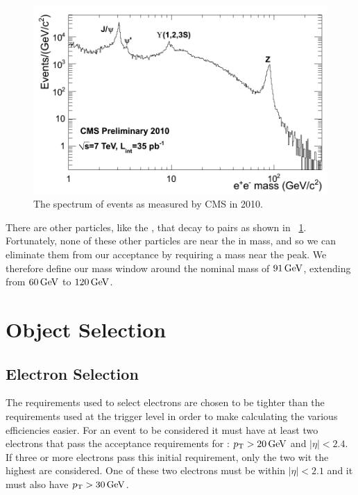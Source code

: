 \begin{figure}[!htbp]
    \centering
    \includegraphics[width=\textwidth]{figures/dielectron_mass_7tev.png}
    \caption{
        The spectrum of \ee events as measured by CMS in 2010.
    }
    \label{fig:ee_spectrum}
\end{figure}

There are other particles, like the \jpsi, that decay to \ee pairs as shown in
\FIG~\ref{fig:ee_spectrum}. Fortunately, none of these other particles are near
the \Z in mass, and so we can eliminate them from our acceptance by requiring a
mass near the \Z peak. We therefore define our mass window around the nominal
\Z mass of $91 \,\text{Ge\hspace{-.08em}V}$, extending from $60 \,\text{Ge\hspace{-.08em}V}$ to $120 \,\text{Ge\hspace{-.08em}V}$.

\section{Object Selection}

\subsection{Electron Selection}
\label{ssec:electron_selection}

The requirements used to select electrons are chosen to be tighter than the
requirements used at the trigger level in order to make calculating the various
efficiencies easier. For an event to be considered it must have at least two
electrons that pass the acceptance requirements for \ExtendedElectrons: $p_{\mathrm{T}} >
20 \,\text{Ge\hspace{-.08em}V}$ and $|\eta| < 2.4$. If three or more electrons pass this initial
requirement, only the two wit the highest \pt are considered. One of these two
electrons must be within $|\eta| < 2.1$ and it must also have $p_{\mathrm{T}} > 30 \,\text{Ge\hspace{-.08em}V}$.

